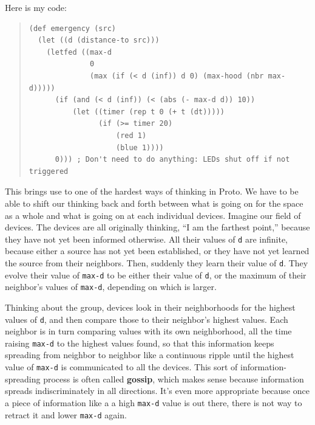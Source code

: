 \documentclass{article}
\newcommand\var[1]{{\tt #1}}
\begin{document}
Here is my code:
\begin{quote}
\begin{verbatim}
(def emergency (src) 
  (let ((d (distance-to src))) 
    (letfed ((max-d 
              0 
              (max (if (< d (inf)) d 0) (max-hood (nbr max-d)))))
      (if (and (< d (inf)) (< (abs (- max-d d)) 10)) 
          (let ((timer (rep t 0 (+ t (dt)))))                        
                (if (>= timer 20) 
                    (red 1) 
                    (blue 1))))
      0))) ; Don't need to do anything: LEDs shut off if not triggered
\end{verbatim}
\end{quote}

This brings use to one of the hardest ways of thinking in Proto.  We
have to be able to shift our thinking back and forth between what is
going on for the space as a whole and what is going on at each
individual devices.  Imagine our field of devices. The devices are all
originally thinking, ``I am the farthest point,'' because they have
not yet been informed otherwise.  All their values of \var{d} are
infinite, because either a source has not yet been established, or
they have not yet learned the source from their neighbors.  Then,
suddenly they learn their value of \var{d}.  They evolve their value
of \var{max-d} to be either their value of \var{d}, or the maximum of
their neighbor's values of \var{max-d}, depending on which is larger.

Thinking about the group, devices look in their neighborhoods for the
highest values of \var{d}, and then compare those to their neighbor's
highest values.  Each neighbor is in turn comparing values with its
own neighborhood, all the time raising \var{max-d} to the highest
values found, so that this information keeps spreading from neighbor
to neighbor like a continuous ripple until the highest value of
\var{max-d} is communicated to all the devices.  This sort of
information-spreading process is often called {\bf gossip}, which
makes sense because information spreads indiscriminately in all
directions.  It's even more appropriate because once a piece of
information like a a high \var{max-d} value is out there, there is not
way to retract it and lower \var{max-d} again.
\end{document}
